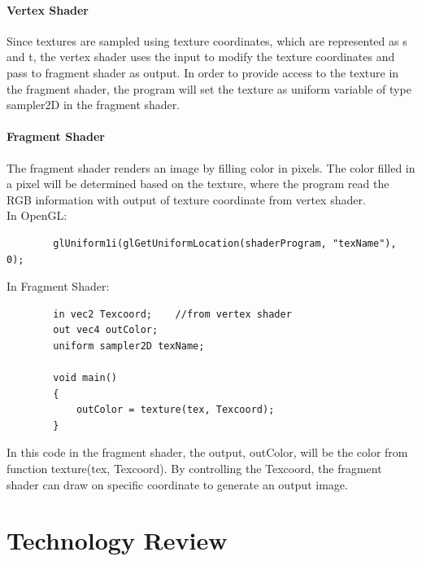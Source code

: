 \documentclass[letterpaper,10pt,serif,draftclsnofoot,onecolumn,compsoc,titlepage]{IEEEtran}
\begin{document}
\paragraph{Vertex Shader}

Since textures are sampled using texture coordinates, which are represented as s and 
t, the vertex shader uses the input to modify the texture coordinates and pass to 
fragment shader as output. In order to provide access to the texture in the fragment 
shader, the program will set the texture as uniform variable of type sampler2D in the 
fragment shader.\\

\paragraph{Fragment Shader}

The fragment shader renders an image by filling color in pixels. The color filled in a 
pixel will be determined based on the texture, where the program read the RGB 
information with output of texture coordinate from vertex shader.\\

In OpenGL:\\
	\begin{lstlisting}
		glUniform1i(glGetUniformLocation(shaderProgram, "texName"), 0);
	\end{lstlisting}
In Fragment Shader:\\
	\begin{lstlisting}
   		in vec2 Texcoord;    //from vertex shader
   		out vec4 outColor;
   		uniform sampler2D texName;

   		void main()
   		{
        	outColor = texture(tex, Texcoord);
   		}
	\end{lstlisting}

In this code in the fragment shader, the output, outColor, will be the color from 
function texture(tex, Texcoord). By controlling the Texcoord, the fragment shader 
can draw on specific coordinate to generate an output image.\\

\newpage

\section{Technology Review}
\end{document}
